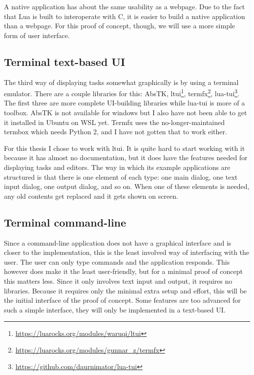 A native application has about the same usability as a webpage. Due to the fact that Lua is built to interoperate with C, it is easier to build a native application than a webpage. For this proof of concept, though, we will use a more simple form of user interface.

\subsection{Terminal text-based UI}
The third way of displaying tasks somewhat graphically is by using a terminal emulator. There are a couple libraries for this:
AbsTK,
ltui\footnote{\url{https://luarocks.org/modules/waruqi/ltui}},
termfx\footnote{\url{https://luarocks.org/modules/gunnar_z/termfx}},
lua-tui\footnote{\url{https://github.com/daurnimator/lua-tui}}. The first three are more complete UI-building libraries while lua-tui is more of a toolbox. AbsTK is not available for windows but I also have not been able to get it installed in Ubuntu on WSL yet. Termfx uses the no-longer-maintained termbox which needs Python 2, and I have not gotten that to work either.

For this thesis I chose to work with ltui. It is quite hard to start working with it because it has almost no documentation, but it does have the features needed for displaying tasks and editors. The way in which its example applications are structured is that there is one element of each type: one main dialog, one text input dialog, one output dialog, and so on. When one of these elements is needed, any old contents get replaced and it gets shown on screen.

\subsection{Terminal command-line}
Since a command-line application does not have a graphical interface and is closer to the implementation, this is the least involved way of interfacing with the user. The user can only type commands and the application responds. This however does make it the least user-friendly, but for a minimal proof of concept this matters less. Since it only involves text input and output, it requires no libraries. Because it requires only the minimal extra setup and effort, this will be the initial interface of the proof of concept. Some features are too advanced for such a simple interface, they will only be implemented in a text-based UI.

